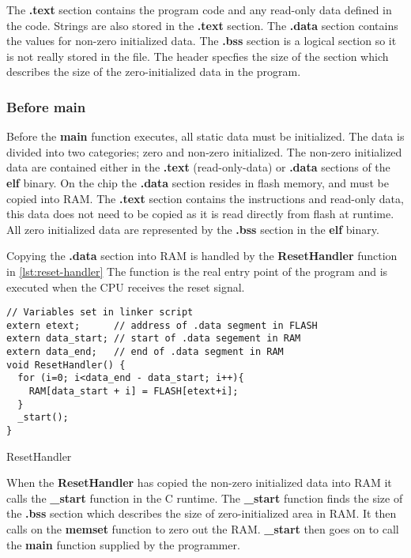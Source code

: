 The \textbf{.text} section contains the program code and any read-only data defined in the code.
Strings are also stored in the \textbf{.text} section.
The \textbf{.data} section contains the values for non-zero initialized data.
The \textbf{.bss} section is a logical section so it is not really stored in the file.
The header specfies the size of the section which describes the size of the zero-initialized data in the program.

\subsubsection{Before main}

Before the \textbf{main} function executes, all static data must be initialized.
The data is divided into two categories; zero and non-zero initialized.
The non-zero initialized data are contained either in the \textbf{.text} (read-only-data) or \textbf{.data} sections of the \textbf{elf} binary.
On the chip the \textbf{.data} section resides in flash memory, and must be copied into RAM.
The \textbf{.text} section contains the instructions and read-only data, this data does not need to be copied as it is read directly from flash at runtime.
All zero initialized data are represented by the \textbf{.bss} section in the \textbf{elf} binary.

Copying the \textbf{.data} section into RAM is handled by the \textbf{ResetHandler} function in \autoref{lst:reset-handler}
The function is the real entry point of the program and is executed when the CPU receives the reset signal.

\begin{listing}[H]
\begin{verbatim}
// Variables set in linker script
extern etext;      // address of .data segment in FLASH
extern data_start; // start of .data segement in RAM
extern data_end;   // end of .data segment in RAM
void ResetHandler() {
  for (i=0; i<data_end - data_start; i++){
    RAM[data_start + i] = FLASH[etext+i];
  }
  _start();
}
\end{verbatim}
\caption{ResetHandler}
\label{lst:reset-handler}
\end{listing}

When the \textbf{ResetHandler} has copied the non-zero initialized data into RAM it calls the \textbf{\_start} function in the C runtime.
The \textbf{\_start} function finds the size of the \textbf{.bss} section which describes the size of zero-initialized area in RAM.
It then calls on the \textbf{memset} function to zero out the RAM.
\textbf{\_start} then goes on to call the \textbf{main} function supplied by the programmer.

